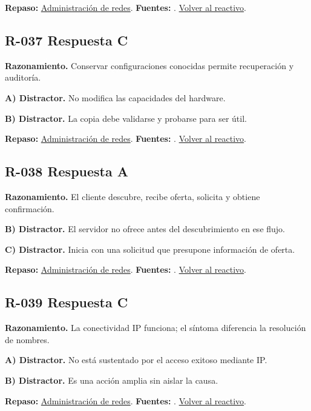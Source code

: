 \textbf{Repaso:} \hyperref[sec:r2]{Administración de redes}. \textbf{Fuentes:} \cite{rfc2131,rfc1034,rfc9293,networks}. \hyperref[q:R-036]{Volver al reactivo}.\par\medskip

\subsection*{R-037 \quad Respuesta C}\label{s:R-037}
\textbf{Razonamiento.} Conservar configuraciones conocidas permite recuperación y auditoría.

\textbf{A) Distractor. }No modifica las capacidades del hardware.

\textbf{B) Distractor. }La copia debe validarse y probarse para ser útil.

\textbf{Repaso:} \hyperref[sec:r2]{Administración de redes}. \textbf{Fuentes:} \cite{rfc2131,rfc1034,rfc9293,networks}. \hyperref[q:R-037]{Volver al reactivo}.\par\medskip

\subsection*{R-038 \quad Respuesta A}\label{s:R-038}
\textbf{Razonamiento.} El cliente descubre, recibe oferta, solicita y obtiene confirmación.

\textbf{B) Distractor. }El servidor no ofrece antes del descubrimiento en ese flujo.

\textbf{C) Distractor. }Inicia con una solicitud que presupone información de oferta.

\textbf{Repaso:} \hyperref[sec:r2]{Administración de redes}. \textbf{Fuentes:} \cite{rfc2131,rfc1034,rfc9293,networks}. \hyperref[q:R-038]{Volver al reactivo}.\par\medskip

\subsection*{R-039 \quad Respuesta C}\label{s:R-039}
\textbf{Razonamiento.} La conectividad IP funciona; el síntoma diferencia la resolución de nombres.

\textbf{A) Distractor. }No está sustentado por el acceso exitoso mediante IP.

\textbf{B) Distractor. }Es una acción amplia sin aislar la causa.

\textbf{Repaso:} \hyperref[sec:r2]{Administración de redes}. \textbf{Fuentes:} \cite{rfc2131,rfc1034,rfc9293,networks}. \hyperref[q:R-039]{Volver al reactivo}.\par\medskip

